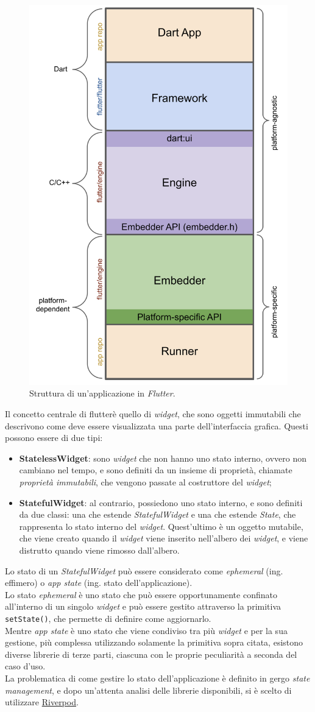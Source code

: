 \begin{figure}[!h] 
    \centering 
    \includegraphics[width=0.4\columnwidth]{images/flutter-app-anatomy.png} 
    \caption{Struttura di un'applicazione in \emph{Flutter}.}
    \label{fig:architettura-flutter}
\end{figure}

Il concetto centrale di \gls{flutter}\glsoccur è quello di \emph{widget}, che sono oggetti immutabili che descrivono come deve essere visualizzata una parte dell'interfaccia grafica. Questi possono essere di due tipi:
\begin{itemize}
    \item \textbf{StatelessWidget}: sono \emph{widget} che non hanno uno stato interno, ovvero non cambiano nel tempo, e sono definiti da un insieme di proprietà, chiamate \emph{proprietà immutabili}, che vengono passate al costruttore del \emph{widget};
    \item \textbf{StatefulWidget}: al contrario, possiedono uno stato interno, e sono definiti da due classi: una che estende \emph{StatefulWidget} e una che estende \emph{State}, che rappresenta lo stato interno del \emph{widget}. Quest'ultimo è un oggetto mutabile, che viene creato quando il \emph{widget} viene inserito nell'albero dei \emph{widget}, e viene distrutto quando viene rimosso dall'albero.
\end{itemize}

Lo stato di un \emph{StatefulWidget} può essere considerato come \emph{ephemeral} (ing. effimero) o \emph{app state} (ing. stato dell'applicazione). \\
Lo stato \emph{ephemeral} è uno stato che può essere opportunamente confinato all'interno di un singolo \emph{widget} e può essere gestito attraverso la primitiva \lstinline{setState()}, che permette di definire come aggiornarlo.\\
Mentre \emph{app state} è uno stato che viene condiviso tra più \emph{widget} e per la sua gestione, più complessa utilizzando solamente la primitiva sopra citata, esistono diverse librerie di terze parti, ciascuna con le proprie peculiarità a seconda del caso d'uso.\\
\indent La problematica di come gestire lo stato dell'applicazione è definito in gergo \emph{state management}, e dopo un'attenta analisi delle librerie disponibili, si è scelto di utilizzare \href{https://riverpod.dev/}{Riverpod}.\\


